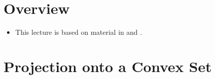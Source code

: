 \documentclass[11pt,twoside]{report}
\begin{document}



\section*{Overview} 

\begin{itemize}


\item This lecture is based on material in  \cite[Chapters 4 and 5]{chamberland:2023EF} and \cite{bauschke:2017}.%


\end{itemize}


\section{Projection onto a Convex Set} 
\end{document}
